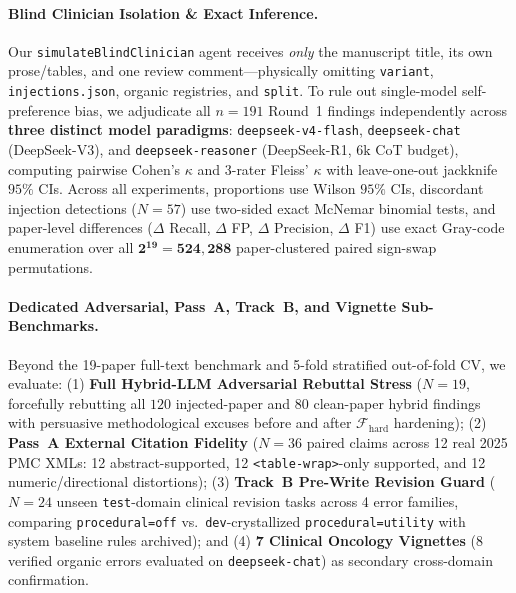 \documentclass[11pt,a4paper]{article}
\begin{document}
\paragraph{Blind Clinician Isolation \& Exact Inference.}
Our \texttt{simulateBlindClinician} agent receives \emph{only} the manuscript title, its own prose/tables, and one review comment---physically omitting \texttt{variant}, \texttt{injections.json}, organic registries, and \texttt{split}. To rule out single-model self-preference bias, we adjudicate all $n=191$ Round~1 findings independently across \textbf{three distinct model paradigms}: \texttt{deepseek-v4-flash}, \texttt{deepseek-chat} (DeepSeek-V3), and \texttt{deepseek-reasoner} (DeepSeek-R1, $6\text{k}$ CoT budget), computing pairwise Cohen's $\kappa$ and 3-rater Fleiss' $\kappa$ \cite{fleiss1971kappa} with leave-one-out jackknife $95\%$ CIs. Across all experiments, proportions use Wilson $95\%$ CIs, discordant injection detections ($N=57$) use two-sided exact McNemar binomial tests, and paper-level differences ($\Delta$ Recall, $\Delta$ FP, $\Delta$ Precision, $\Delta$ F1) use exact Gray-code enumeration over all $\mathbf{2^{19} = 524{,}288}$ paper-clustered paired sign-swap permutations.

\paragraph{Dedicated Adversarial, Pass~A, Track~B, and Vignette Sub-Benchmarks.}
Beyond the 19-paper full-text benchmark and 5-fold stratified out-of-fold CV, we evaluate: (1) \textbf{Full Hybrid-LLM Adversarial Rebuttal Stress} ($N=19$, forcefully rebutting all $120$ injected-paper and $80$ clean-paper hybrid findings with persuasive methodological excuses before and after $\mathcal{F}_{\text{hard}}$ hardening); (2) \textbf{Pass~A External Citation Fidelity} ($N=36$ paired claims across 12 real 2025 PMC XMLs: 12 abstract-supported, 12 \texttt{<table-wrap>}-only supported, and 12 numeric/directional distortions); (3) \textbf{Track~B Pre-Write Revision Guard} ($N=24$ unseen \texttt{test}-domain clinical revision tasks across 4 error families, comparing \texttt{procedural=off} vs.\ \texttt{dev}-crystallized \texttt{procedural=utility} with system baseline rules archived); and (4) \textbf{7 Clinical Oncology Vignettes} ($8$ verified organic errors evaluated on \texttt{deepseek-chat}) as secondary cross-domain confirmation.

\end{document}
